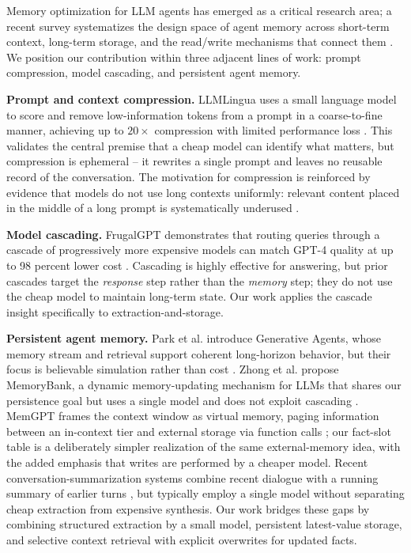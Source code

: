 \documentclass[conference]{IEEEtran}
\begin{document}
Memory optimization for LLM agents has emerged as a critical research area; a recent survey systematizes the design space of agent memory across short-term context, long-term storage, and the read/write mechanisms that connect them \cite{zhang2024memorysurvey}. We position our contribution within three adjacent lines of work: prompt compression, model cascading, and persistent agent memory.

\textbf{Prompt and context compression.} LLMLingua uses a small language model to score and remove low-information tokens from a prompt in a coarse-to-fine manner, achieving up to $20\times$ compression with limited performance loss \cite{jiang2023llmlingua}. This validates the central premise that a cheap model can identify what matters, but compression is ephemeral -- it rewrites a single prompt and leaves no reusable record of the conversation. The motivation for compression is reinforced by evidence that models do not use long contexts uniformly: relevant content placed in the middle of a long prompt is systematically underused \cite{nfliu2023lost}.

\textbf{Model cascading.} FrugalGPT demonstrates that routing queries through a cascade of progressively more expensive models can match GPT-4 quality at up to 98 percent lower cost \cite{chen2023frugalgpt}. Cascading is highly effective for answering, but prior cascades target the \emph{response} step rather than the \emph{memory} step; they do not use the cheap model to maintain long-term state. Our work applies the cascade insight specifically to extraction-and-storage.

\textbf{Persistent agent memory.} Park et al. introduce Generative Agents, whose memory stream and retrieval support coherent long-horizon behavior, but their focus is believable simulation rather than cost \cite{park2023generative}. Zhong et al. propose MemoryBank, a dynamic memory-updating mechanism for LLMs that shares our persistence goal but uses a single model and does not exploit cascading \cite{zhong2024memorybank}. MemGPT frames the context window as virtual memory, paging information between an in-context tier and external storage via function calls \cite{packer2023memgpt}; our fact-slot table is a deliberately simpler realization of the same external-memory idea, with the added emphasis that writes are performed by a cheaper model. Recent conversation-summarization systems combine recent dialogue with a running summary of earlier turns \cite{acl2024}, but typically employ a single model without separating cheap extraction from expensive synthesis. Our work bridges these gaps by combining structured extraction by a small model, persistent latest-value storage, and selective context retrieval with explicit overwrites for updated facts.
\end{document}
